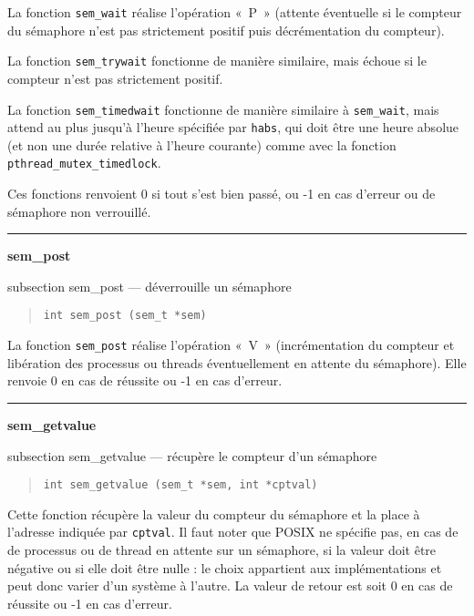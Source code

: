 \documentclass [twoside] {report}
\newcommand {\primitive} [1]
    {
	{\large \bf #1}
	\addcontentsline {toc} {subsection} {#1}
    }
\newcommand {\separation}
    {
	\vspace {7mm}
	\nopagebreak
	\hrule
    }
\begin{document}
La fonction \verb|sem_wait| réalise l'opération «~P~» (attente
éventuelle si le compteur du sémaphore n'est pas strictement positif
puis décrémentation du compteur).

La fonction \verb|sem_trywait| fonctionne de manière similaire,
mais échoue si le compteur n'est pas strictement positif.

La fonction \verb|sem_timedwait| fonctionne de manière similaire à
\verb|sem_wait|, mais attend au plus jusqu'à l'heure spécifiée par
\texttt {habs}, qui doit être une heure absolue (et non une durée
relative à l'heure courante) comme avec la fonction
\verb|pthread_mutex_timedlock|.

Ces fonctions renvoient 0 si tout s'est bien passé, ou -1 en cas d'erreur
ou de sémaphore non verrouillé.


\separation
\primitive {sem\_post} --- déverrouille un sémaphore

\begin {quote}
\begin {verbatim}
int sem_post (sem_t *sem)
\end{verbatim}
\end {quote}

La fonction \verb|sem_post| réalise l'opération «~V~» (incrémentation
du compteur et libération des processus ou threads éventuellement
en attente du sémaphore). Elle renvoie 0 en cas de réussite ou -1 en
cas d'erreur.


\separation
\primitive {sem\_getvalue} --- récupère le compteur d'un sémaphore

\begin {quote}
\begin {verbatim}
int sem_getvalue (sem_t *sem, int *cptval)
\end{verbatim}
\end {quote}

Cette fonction récupère la valeur du compteur du sémaphore et la
place à l'adresse indiquée par \texttt {cptval}. Il faut noter que
POSIX ne spécifie pas, en cas de de processus ou de thread en attente
sur un sémaphore, si la valeur doit être négative ou si elle doit
être nulle : le choix appartient aux implémentations et peut donc
varier d'un système à l'autre. La valeur de retour est soit 0 en cas
de réussite ou -1 en cas d'erreur.



% 
% 



\cleardoublepage

\printindex
\end{document}
